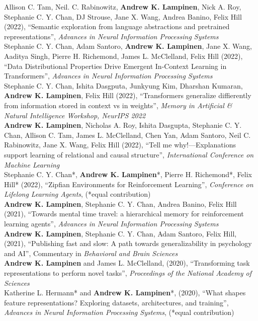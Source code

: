 \documentclass[margin]{res}
\begin{document}
\begin{resume}
Allison C. Tam,  Neil. C. Rabinowitz, \textbf{Andrew K. Lampinen}, Nick A. Roy, Stephanie C. Y. Chan, DJ Strouse, Jane X. Wang, Andrea Banino, Felix Hill (2022), {``Semantic exploration from language abstractions and pretrained representations'',} \textit{Advances in Neural Information Processing Systems} \\[5pt] 
Stephanie C. Y. Chan, Adam Santoro, \textbf{Andrew K. Lampinen}, Jane X. Wang, Aaditya Singh, Pierre H. Richemond, James L. McClelland, Felix Hill (2022), {``Data Distributional Properties Drive Emergent In-Context Learning in Transformers'',} \textit{Advances in Neural Information Processing Systems} \\[5pt] 
Stephanie C. Y. Chan, Ishita Dasgputa, Junkyung Kim, Dharshan Kumaran, \textbf{Andrew K. Lampinen}, Felix Hill (2022), {``Transformers generalize diffierently from information stored in context vs in weights'',} \textit{Memory in Artificial \& Natural Intelligence Workshop, NeurIPS 2022} \\[5pt]
\textbf{Andrew K. Lampinen}, Nicholas A. Roy, Ishita Dasgupta, Stephanie C. Y. Chan, Allison C. Tam, James L. McClelland, Chen Yan, Adam Santoro, Neil C. Rabinowitz, Jane X. Wang, Felix Hill (2022), {``Tell me why!---Explanations support learning of relational and causal structure'',} \textit{International Conference on Machine Learning} \\[5pt] 
Stephanie C. Y. Chan*, \textbf{Andrew K. Lampinen}*, Pierre H. Richemond*, Felix Hill* (2022), {``Zipfian Environments for Reinforcement Learning'',} \textit{Conference on Lifelong Learning Agents}, (*equal contribution) \\[5pt] 
\textbf{Andrew K. Lampinen}, Stephanie C. Y. Chan, Andrea Banino, Felix Hill (2021), {``Towards mental time travel: a hierarchical memory for reinforcement learning agents'',} \textit{Advances in Neural Information Processing Systems} \\[5pt] 
\textbf{Andrew K. Lampinen}, Stephanie C. Y. Chan, Adam Santoro, Felix Hill, (2021), {``Publishing fast and slow: A path towards generalizability in psychology and AI'',} Commentary in \textit{Behavioral and Brain Sciences} \\[5pt] 
\textbf{Andrew K. Lampinen} and James L. McClelland, (2020), {``Transforming task representations to perform novel tasks'',} \textit{Proceedings of the National Academy of Sciences} \\[5pt] 
Katherine L. Hermann* and \textbf{Andrew K. Lampinen}*, (2020), {``What shapes feature representations? Exploring datasets, architectures, and training'',} \textit{Advances in Neural Information Processing Systems}, (*equal contribution) \\[5pt] 

\end{resume}
\end{document}
